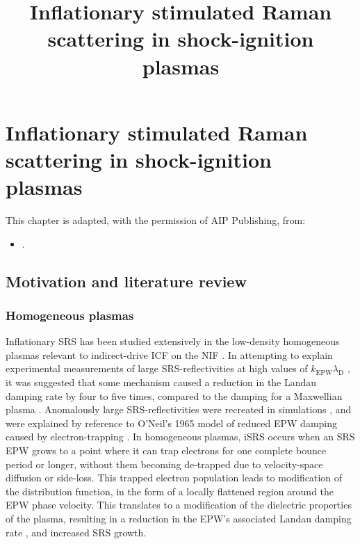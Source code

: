 
\chapter{Inflationary stimulated Raman scattering in shock-ignition plasmas}
\label{chp:iSRS}
%

\title{Inflationary stimulated Raman scattering in shock-ignition plasmas}

This chapter is adapted, with the permission of AIP Publishing, from:
\begin{itemize}
  \item {}.
\end{itemize}

\section{Motivation and literature review}


\subsection{Homogeneous plasmas}
Inflationary SRS has been studied
extensively in the low-density homogeneous plasmas relevant to indirect-drive ICF on the NIF
\cite{Vu2002,Yin2006,Vu2007,Strozzi2007,Yin2008,Yin2012,Ellis2012}.
In attempting to explain experimental measurements of large SRS-reflectivities at high values of $k_\mathrm{EPW}\lambda_\mathrm{D}$
\cite{Fernandez2000,Montgomery2002}, it was suggested that some mechanism caused a reduction in the Landau damping
rate by four to five times, compared to the damping for a Maxwellian plasma \cite{Montgomery2002}.
Anomalously large SRS-reflectivities were recreated in simulations \cite{Vu2001,Vu2002}, and were explained by
reference to O'Neil's 1965 model of reduced EPW  damping caused by electron-trapping \cite{ONeil1965}.
In homogeneous plasmas, iSRS occurs when an SRS EPW grows to a point where it can trap electrons for one
complete bounce period or longer, without them becoming de-trapped due to velocity-space diffusion or
side-loss\cite{Vu2002}. This trapped electron population leads to modification of the distribution
function, in the form of a locally flattened region around the EPW phase velocity.
This translates to a modification of the dielectric properties of the plasma, resulting in a reduction in
the EPW's associated Landau damping rate \cite{ONeil1965,Vu2002}, and increased SRS growth.

